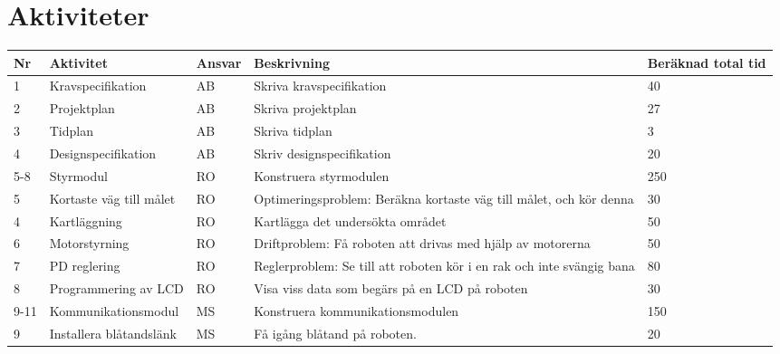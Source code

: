 \documentclass[11pt]{article}
\begin{document}
\begin{flushleft}
\begin{table}[h]
\begin{tabular}{|l|p{.75\linewidth}|l|}
\end{tabular}
\end{table}

\pagebreak

\section{Aktiviteter}
\begin{table}[h]
\begin{tabular}{|l|p{.30\linewidth}|l|p{.40\linewidth}|p{.10\linewidth}|} \hline

Nr & 
Aktivitet & 
Ansvar & 
Beskrivning & 
Beräknad total tid \\[0.1in] \hline

1 &
Kravspecifikation &
AB &
Skriva kravspecifikation &
40 \\ \hline

2 &
Projektplan &
AB &
Skriva projektplan &
27 \\ \hline

3 &
Tidplan &
AB &
Skriva tidplan &
3 \\ \hline
 
4 &
Designspecifikation &
AB &
Skriv designspecifikation &
20 \\ \hline
 
5-8 &
Styrmodul &
RO &
Konstruera styrmodulen &
250 \\ \hline

5 &
Kortaste väg till målet &
RO &
Optimeringsproblem: Beräkna kortaste väg till målet, och kör denna &
30 \\ \hline
 
4 &
Kartläggning &
RO &
Kartlägga det undersökta området &
50 \\ \hline
 
6 &
Motorstyrning &
RO &
Driftproblem: Få roboten att drivas med hjälp av motorerna &
50 \\ \hline
 
7 &
PD reglering &
RO &
Reglerproblem: Se till att roboten kör i en rak och inte svängig bana &
80 \\ \hline
 
8 &
Programmering av LCD &
RO &
Visa viss data som begärs på en LCD på roboten &
30 \\ \hline
 
9-11 &
Kommunikationsmodul &
MS &
Konstruera kommunikationsmodulen &
150 \\ \hline
 
 
9 &
Installera blåtandslänk &
MS &
Få igång blåtand på roboten. &
20 \\ \hline
 

\end{tabular}
\end{table}
\end{flushleft}
\end{document}

